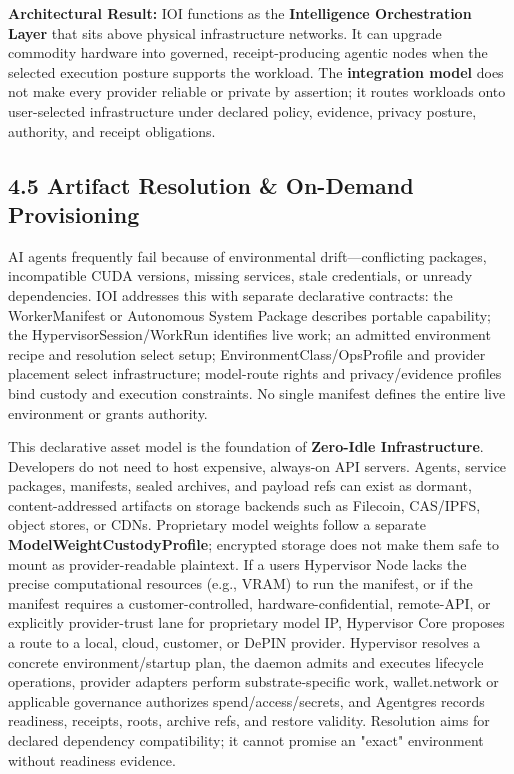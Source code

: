 \documentclass[
  11pt,
]{article}
\begin{document}
\textbf{Architectural Result: }IOI functions as the \textbf{Intelligence
Orchestration Layer} that sits above physical infrastructure networks.
It can upgrade commodity hardware into governed, receipt-producing
agentic nodes when the selected execution posture supports the workload.
The \textbf{integration model} does not make every provider reliable or
private by assertion; it routes workloads onto user-selected
infrastructure under declared policy, evidence, privacy posture,
authority, and receipt obligations.

\hypertarget{artifact-resolution-on-demand-provisioning}{%
\subsection{4.5 Artifact Resolution \& On-Demand
Provisioning}\label{artifact-resolution-on-demand-provisioning}}

AI agents frequently fail because of environmental drift---conflicting
packages, incompatible CUDA versions, missing services, stale credentials, or
unready dependencies. IOI addresses this with separate declarative contracts:
the WorkerManifest or Autonomous System Package describes portable capability;
the HypervisorSession/WorkRun identifies live work; an admitted environment
recipe and resolution select setup; EnvironmentClass/OpsProfile and provider
placement select infrastructure; model-route rights and privacy/evidence
profiles bind custody and execution constraints. No single manifest defines
the entire live environment or grants authority.

This declarative asset model is the foundation of \textbf{Zero-Idle
Infrastructure}. Developers do not need to host expensive, always-on API
servers. Agents, service packages, manifests, sealed archives, and payload
refs can exist as dormant, content-addressed artifacts on storage backends
such as Filecoin, CAS/IPFS, object stores, or CDNs. Proprietary model
weights follow a separate \textbf{ModelWeightCustodyProfile}; encrypted
storage does not make them safe to mount as provider-readable plaintext.
If a
user\textquotesingle s Hypervisor Node lacks the precise computational
resources (e.g., VRAM) to run the manifest, or if the manifest requires
a customer-controlled, hardware-confidential, remote-API, or explicitly
provider-trust lane for proprietary model IP, Hypervisor Core proposes a
route to a local, cloud, customer, or DePIN provider. Hypervisor resolves a
concrete environment/startup plan, the daemon admits and executes lifecycle
operations, provider adapters perform substrate-specific work, wallet.network
or applicable governance authorizes spend/access/secrets, and Agentgres records
readiness, receipts, roots, archive refs, and restore validity. Resolution aims
for declared dependency compatibility; it cannot promise an "exact"
environment without readiness evidence.
\end{document}
